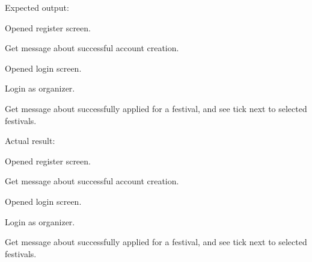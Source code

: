 			Expected output:
			\begin{packed_enum}
				\item Opened register screen.
				\item Get message about successful account creation.
				\item Opened login screen.
				\item Login as organizer.
				\item Get message about successfully applied for a festival, and see tick next to selected festivals.
			\end{packed_enum}
			
			Actual result:
			\begin{packed_enum}
				\item Opened register screen.
				\item Get message about successful account creation.
				\item Opened login screen.
				\item Login as organizer.
				\item Get message about successfully applied for a festival, and see tick next to selected festivals.
			\end{packed_enum}
			
